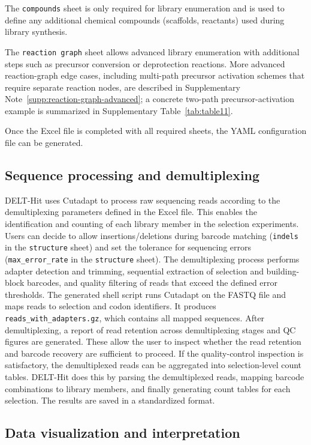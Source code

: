 \documentclass[pdflatex,sn-nature]{sn-jnl}
\begin{document}
The \texttt{compounds} sheet is only required for library enumeration and is used to define any additional chemical compounds (scaffolds, reactants) used during library synthesis. 

The \texttt{reaction graph} sheet allows advanced library enumeration with additional steps such as precursor conversion or deprotection reactions. More advanced reaction-graph edge cases, including multi-path precursor activation schemes that require separate reaction nodes, are described in Supplementary Note~\ref{supp:reaction-graph-advanced}; a concrete two-path precursor-activation example is summarized in Supplementary Table~\ref{tab:table11}. 

Once the Excel file is completed with all required sheets, the YAML configuration file can be generated. 

\subsection{Sequence processing and demultiplexing}

DELT-Hit uses Cutadapt to process raw sequencing reads according to the demultiplexing parameters defined in the Excel file. This enables the identification and counting of each library member in the selection experiments. Users can decide to allow insertions/deletions during barcode matching (\texttt{indels} in the \texttt{structure} sheet) and set the tolerance for sequencing errors (\texttt{max\_error\_rate} in the \texttt{structure} sheet). The demultiplexing process performs adapter detection and trimming, sequential extraction of selection and building-block barcodes, and quality filtering of reads that exceed the defined error thresholds. The generated shell script runs Cutadapt on the FASTQ file and maps reads to selection and codon identifiers. It produces \texttt{reads\_with\_adapters.gz}, which contains all mapped sequences. After demultiplexing, a report of read retention across demultiplexing stages and QC figures are generated. These allow the user to inspect whether the read retention and barcode recovery are sufficient to proceed. If the quality-control inspection is satisfactory, the demultiplexed reads can be aggregated into selection-level count tables. DELT-Hit does this by parsing the demultiplexed reads, mapping barcode combinations to library members, and finally generating count tables for each selection. The results are saved in a standardized format. 

\subsection{Data visualization and interpretation}
\end{document}
